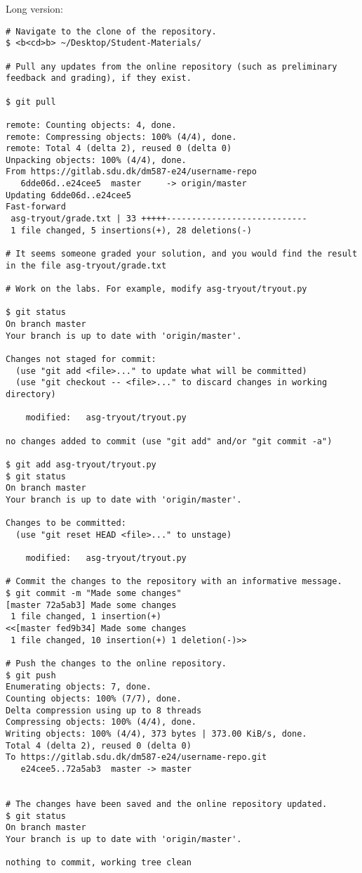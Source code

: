 Long version:
\begin{lstlisting}
# Navigate to the clone of the repository.
$ <b<cd>b> ~/Desktop/Student-Materials/

# Pull any updates from the online repository (such as preliminary feedback and grading), if they exist.

$ git pull

remote: Counting objects: 4, done.
remote: Compressing objects: 100% (4/4), done.
remote: Total 4 (delta 2), reused 0 (delta 0)
Unpacking objects: 100% (4/4), done.
From https://gitlab.sdu.dk/dm587-e24/username-repo
   6dde06d..e24cee5  master     -> origin/master
Updating 6dde06d..e24cee5
Fast-forward
 asg-tryout/grade.txt | 33 +++++----------------------------
 1 file changed, 5 insertions(+), 28 deletions(-)

# It seems someone graded your solution, and you would find the result in the file asg-tryout/grade.txt
 
# Work on the labs. For example, modify asg-tryout/tryout.py

$ git status
On branch master
Your branch is up to date with 'origin/master'.

Changes not staged for commit:
  (use "git add <file>..." to update what will be committed)
  (use "git checkout -- <file>..." to discard changes in working directory)

	modified:   asg-tryout/tryout.py

no changes added to commit (use "git add" and/or "git commit -a")

$ git add asg-tryout/tryout.py
$ git status
On branch master
Your branch is up to date with 'origin/master'.

Changes to be committed:
  (use "git reset HEAD <file>..." to unstage)

	modified:   asg-tryout/tryout.py

# Commit the changes to the repository with an informative message.
$ git commit -m "Made some changes"
[master 72a5ab3] Made some changes
 1 file changed, 1 insertion(+)
<<[master fed9b34] Made some changes
 1 file changed, 10 insertion(+) 1 deletion(-)>>

# Push the changes to the online repository.
$ git push
Enumerating objects: 7, done.
Counting objects: 100% (7/7), done.
Delta compression using up to 8 threads
Compressing objects: 100% (4/4), done.
Writing objects: 100% (4/4), 373 bytes | 373.00 KiB/s, done.
Total 4 (delta 2), reused 0 (delta 0)
To https://gitlab.sdu.dk/dm587-e24/username-repo.git
   e24cee5..72a5ab3  master -> master


# The changes have been saved and the online repository updated.
$ git status
On branch master
Your branch is up to date with 'origin/master'.

nothing to commit, working tree clean
\end{lstlisting}


